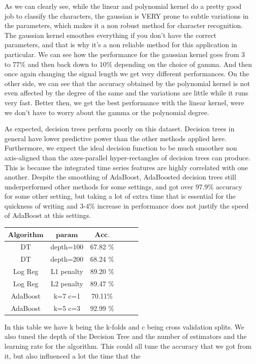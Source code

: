 \documentclass{article}
\begin{document}
As we can clearly see, while the linear and polynomial kernel do a pretty good job to classify the characters, the gaussian is VERY prone to subtle variations in the parameters, which makes it a non robust method for character recognition. The gaussian kernel smoothes everything if you don't have the correct parameters, and that is why it's a non reliable method for this application in particular. We can see how the performance for the gaussian kernel goes from 3 to 77\% and then back down to 10\% depending on the choice of gamma. And then once again changing the signal length we get very different performances. \newline
On the other side, we can see that the accuracy obtained by the polynomial kernel is not even affected by the degree of the same and the variations are little while it runs very fast. Better then, we get the best performance with the linear kernel, were we don't have to worry about the gamma or the polynomial degree.

As expected, decision trees perform poorly on this dataset.  Decision trees in general have lower predictive power than the other methods applied here.  Furthermore, we expect the ideal decision function to be much smoother non axis-aligned than the axes-parallel hyper-rectangles of decision trees can produce.  This is because the integrated time series features are highly correlated with one another.  Despite the smoothing of AdaBoost, AdaBoosted decision trees still underperformed other methods for some settings, and got over 97.9\% accuracy for some other setting, but taking a lot of extra time that is essential for the quickness of writing and 3-4\% increase in performance does not justify the speed of AdaBoost at this settings.

\begin{center}
    \begin{tabular}{ | c | c | c | c | c | r |}
    \hline
    $\textbf{Algorithm}$ & $\textbf{param}$ & $\textbf{Acc.}$ \\ \hline
    DT & depth=100 & 67.82 $\%$ \\ \hline
    DT & depth=200 & 68.24 $\%$ \\ \hline
    Log Reg & L1 penalty & 89.20 $\%$ \\ \hline
    Log Reg & L2 penalty & 89.47 $\%$ \\ \hline
    AdaBoost & k=7 c=1 & 70.11$\%$ \\ \hline
    AdaBoost & k=5 c=3 & 92.99 $\%$ \\ \hline
    
    \end{tabular}
\end{center}
In this table we have k being the k-folds and c being cross validation splits. We also tuned the depth of the Decision Tree and the number of estimators and the learning rate for the algorithm. This could all tune the accuracy that we got from it, but also influenced a lot the time that the 
\end{document}
